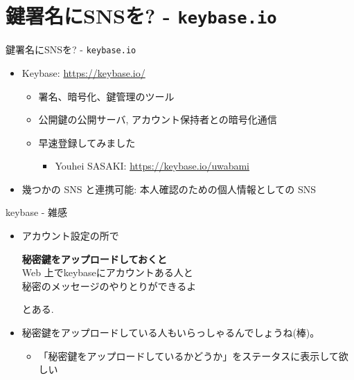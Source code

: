 \documentclass[cjk,c,squeeze,shrink,dvipdfmx,11pt,%
hyperref={bookmarks=true,bookmarksnumbered=true,bookmarksopen=false,%
colorlinks=false,%
pdftitle={},%
pdfauthor={}%
pdfinstitute={関西 Debian 勉強会},%
pdfsubject={},%
}]{beamer}
\begin{document}
\section{鍵署名にSNSを? - \texttt{keybase.io}}
\begin{frame}{鍵署名にSNSを? - \texttt{keybase.io}}
  \begin{itemize}
  \item Keybase: \url{https://keybase.io/}
    \begin{itemize}
    \item %
      署名、暗号化、鍵管理のツール
    \item %
      公開鍵の公開サーバ, アカウント保持者との暗号化通信
    \item %
      早速登録してみました
      \begin{itemize}
      \item Youhei SASAKI: \url{https://keybase.io/uwabami}
      \end{itemize}
    \end{itemize}
  \item %
    幾つかの SNS と連携可能:
    本人確認のための個人情報としての SNS
  \end{itemize}
\end{frame}
\begin{frame}{keybase - 雑感}
  \begin{itemize}
  \item %
    アカウント設定の所で
    \begin{center}
      \textbf{秘密鍵をアップロードしておくと}\\
      Web 上でkeybaseにアカウントある人と\\
      秘密のメッセージのやりとりができるよ
    \end{center}
    とある.
  \item %
    秘密鍵をアップロードしている人もいらっしゃるんでしょうね(棒)。
    \begin{itemize}
    \item %
      「秘密鍵をアップロードしているかどうか」をステータスに表示して欲しい
    \end{itemize}
  \end{itemize}
\end{frame}
\end{document}

